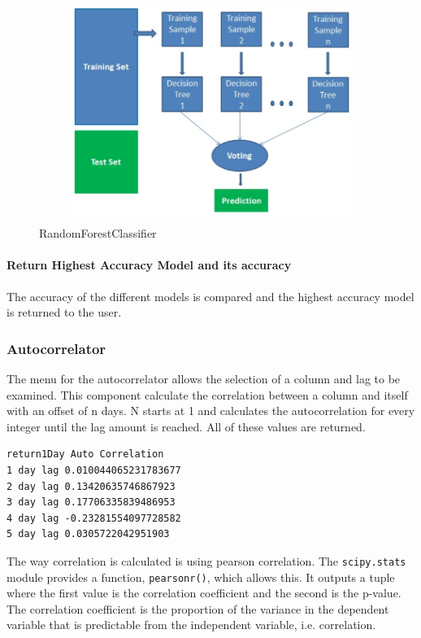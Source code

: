 \begin{itemize}
\begin{figure}[h!]
        \centering
        \includegraphics[width=15cm,height=7cm,keepaspectratio]{implementation/randomForest.png}
        \caption{RandomForestClassifier}
        \label{fig:randomForest}
    \end{figure}
\end{itemize}

\paragraph{Return Highest Accuracy Model and its accuracy}

The accuracy of the different models is compared and the highest accuracy model is returned to the user.

\subsubsection{Autocorrelator}

The menu for the autocorrelator allows the selection of a column and lag to be examined. This component calculate the correlation between a column and itself with an offset of n days. N starts at 1 and calculates the autocorrelation for every integer until the lag amount is reached. All of these values are returned.

\begin{lstlisting}[caption=Example AutoCorrelator Output when lag = 5 for return1Day column]
return1Day Auto Correlation
1 day lag 0.010044065231783677
2 day lag 0.13420635746867923
3 day lag 0.17706335839486953
4 day lag -0.23281554097728582
5 day lag 0.0305722042951903
\end{lstlisting}

The way correlation is calculated is using pearson correlation. The \verb|scipy.stats| module provides a function, \verb|pearsonr()|, which allows this. It outputs a tuple where the first value is the correlation coefficient and the second is the p-value. The correlation coefficient is the proportion of the variance in the dependent variable that is predictable from the independent variable, i.e. correlation.

